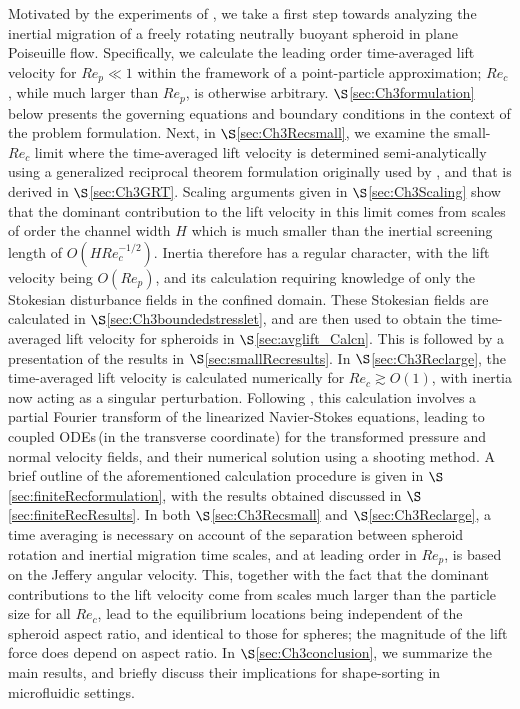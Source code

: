 \documentclass{jfm}
\begin{document}
Motivated by the experiments of \cite{masaeli2012}, we take a first step towards analyzing the inertial migration of a freely rotating neutrally buoyant spheroid in plane Poiseuille flow. Specifically, we calculate the leading order time-averaged lift velocity for $Re_p\ll 1$ within the framework of a point-particle approximation; $Re_c$, while much larger than $Re_p$, is otherwise arbitrary. $\S$\ref{sec:Ch3formulation} below presents the governing equations and boundary conditions in the context of the problem formulation. Next, in $\S$\ref{sec:Ch3Recsmall}, we examine the small-$Re_c$ limit where the time-averaged lift velocity is determined semi-analytically using a generalized reciprocal theorem formulation originally used by \cite{holeal1974}, and that is derived in $\S$\ref{sec:Ch3GRT}. Scaling arguments given in $\S$\ref{sec:Ch3Scaling} show that the dominant contribution to the lift velocity in this limit comes from scales of order the channel width $H$ which is much smaller than the inertial screening length of $O(HRe_c^{-1/2})$. Inertia therefore has a regular character, with the lift velocity being $O(Re_p)$, and its calculation requiring knowledge of only the Stokesian disturbance fields in the confined domain. These Stokesian fields are calculated in $\S$\ref{sec:Ch3boundedstresslet}, and are then used to obtain the time-averaged lift velocity for spheroids in $\S$\ref{sec:avglift_Calcn}. This is followed by a presentation of the results in $\S$\ref{sec:smallRecresults}. In $\S$\ref{sec:Ch3Reclarge}, the time-averaged lift velocity is calculated numerically for $Re_c\gtrsim O(1)$, with inertia now acting as a singular perturbation. Following \cite{schonberghinch1989}, this calculation involves a partial Fourier transform of the linearized Navier-Stokes equations, leading to coupled ODEs\,(in the transverse coordinate) for the transformed pressure and normal velocity fields, and their numerical solution using a shooting method. A brief outline of the aforementioned calculation procedure is given in $\S$\ref{sec:finiteRecformulation}, with the results obtained discussed in $\S$\ref{sec:finiteRecResults}. In both $\S$\ref{sec:Ch3Recsmall} and $\S$\ref{sec:Ch3Reclarge}, a time averaging is necessary on account of the separation between spheroid rotation and inertial migration time scales, and at leading order in $Re_p$, is based on the Jeffery angular velocity. This, together with the fact that the dominant contributions to the lift velocity come from scales much larger than the particle size for all $Re_c$, lead to the equilibrium locations being independent of the spheroid aspect ratio, and identical to those for spheres; the magnitude of the lift force does depend on aspect ratio. In $\S$\ref{sec:Ch3conclusion}, we summarize the main results, and briefly discuss their implications for shape-sorting in microfluidic settings.
\end{document}
